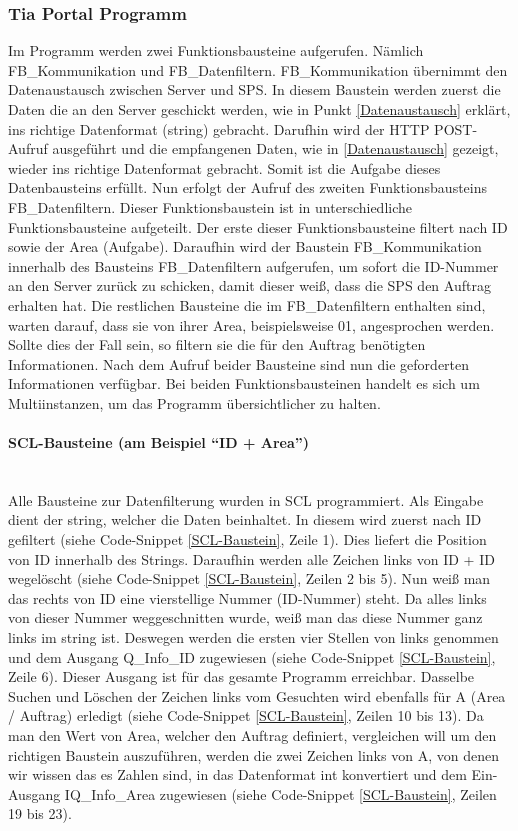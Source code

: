     \subsubsection{Tia Portal Programm}
    Im Programm werden zwei Funktionsbausteine aufgerufen. Nämlich FB\_Kommunikation und FB\_Datenfiltern. FB\_Kommunikation übernimmt den Datenaustausch zwischen Server und SPS. In diesem Baustein werden zuerst die Daten die an den Server geschickt werden, wie in Punkt \ref{Datenaustausch} erklärt, ins richtige Datenformat (string) gebracht. Darufhin wird der HTTP POST-Aufruf ausgeführt und die empfangenen Daten, wie in \ref{Datenaustausch} gezeigt, wieder ins richtige Datenformat gebracht. Somit ist die Aufgabe dieses Datenbausteins erfüllt. Nun erfolgt der Aufruf des zweiten Funktionsbausteins FB\_Datenfiltern. Dieser Funktionsbaustein ist in unterschiedliche Funktionsbausteine aufgeteilt. Der erste dieser Funktionsbausteine filtert nach ID sowie der Area (Aufgabe). Daraufhin wird der Baustein FB\_Kommunikation innerhalb des Bausteins FB\_Datenfiltern aufgerufen, um sofort die ID-Nummer an den Server zurück zu schicken, damit dieser weiß, dass die SPS den Auftrag erhalten hat. Die restlichen Bausteine die im FB\_Datenfiltern enthalten sind, warten darauf, dass sie von ihrer Area, beispielsweise 01, angesprochen werden. Sollte dies der Fall sein, so filtern sie die für den Auftrag benötigten Informationen. Nach dem Aufruf beider Bausteine sind nun die geforderten Informationen verfügbar. Bei beiden Funktionsbausteinen handelt es sich um Multiinstanzen, um das Programm übersichtlicher zu halten. 

    \paragraph{SCL-Bausteine (am Beispiel \enquote{ID + Area})} 
    \mbox{} \\
    Alle Bausteine zur Datenfilterung wurden in SCL programmiert. Als Eingabe dient der string, welcher die Daten beinhaltet. In diesem wird zuerst nach ID gefiltert (siehe Code-Snippet \ref{SCL-Baustein}, Zeile 1). Dies liefert die Position von ID innerhalb des Strings. Daraufhin werden alle Zeichen links von ID + ID wegelöscht (siehe Code-Snippet \ref{SCL-Baustein}, Zeilen 2 bis 5). Nun weiß man das rechts von ID eine vierstellige Nummer (ID-Nummer) steht. Da alles links von dieser Nummer weggeschnitten wurde, weiß man das diese Nummer ganz links im string ist. Deswegen werden die ersten vier Stellen von links genommen und dem Ausgang Q\_Info\_ID zugewiesen (siehe Code-Snippet \ref{SCL-Baustein}, Zeile 6). Dieser Ausgang ist für das gesamte Programm erreichbar. Dasselbe Suchen und Löschen der Zeichen links vom Gesuchten wird ebenfalls für A (Area / Auftrag) erledigt (siehe Code-Snippet \ref{SCL-Baustein}, Zeilen 10 bis 13). Da man den Wert von Area, welcher den Auftrag definiert, vergleichen will um den richtigen Baustein auszuführen, werden die zwei Zeichen links von A, von denen wir wissen das es Zahlen sind, in das Datenformat int konvertiert und dem Ein-Ausgang IQ\_Info\_Area zugewiesen (siehe Code-Snippet \ref{SCL-Baustein}, Zeilen 19 bis 23). \\

